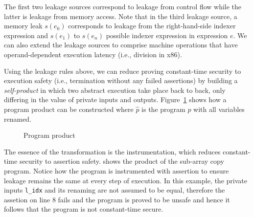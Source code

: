 The first two leakage sources correspond to leakage from control flow while the
latter is leakage from memory access. Note that in the third leakage source,
a memory leak $s(e_0)$ corresponds to leakage from the right-hand-side indexer
expression and $s(e_1)$ to $s(e_n)$ possible indexer expression in expression
$e$. We can also extend the leakage sources to comprise machine operations that
have operand-dependent execution latency (i.e., division in x86).

Using the leakage rules above, we can reduce proving constant-time security to
execution safety (i.e., termination without any failed assertions) by building a
\emph{self-product} in which two abstract execution take place back to back,
only differing in the value of private inputs and outputs.
Figure~\ref{fig:rules} shows how a program product can be constructed where 
$\hat{p}$ is the program $p$ with all variables renamed.

\begin{figure}[h]
    \centering
    \label{fig:fig_7}
    \label{fig:fig_8}
    \caption{Program product}
    \label{fig:rules}
\end{figure}


The essence of the transformation is the instrumentation, which reduces 
constant-time security to assertion safety.  shows 
the product of the sub-array copy program. Notice how  the program is instrumented
with assertion to ensure leakage remains the same at every step of execution.
In this example, the private inputs \texttt{l\_idx} and its renaming are not
assumed to be equal, therefore the assetion on line 8 fails and the program 
is proved to be unsafe and hence it follows that the program is not constant-time
secure.

